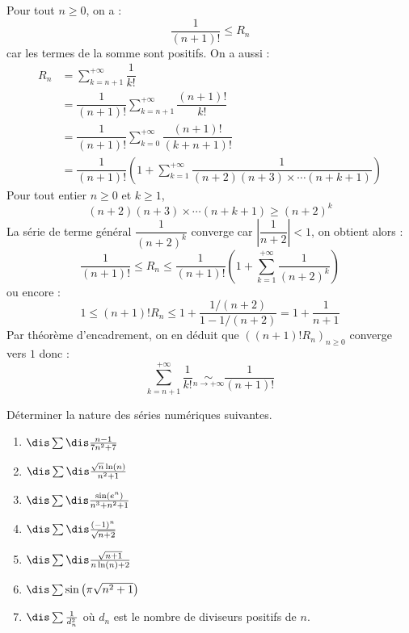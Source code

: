 \documentclass[a4paper,10pt]{report}
\newcommand{\Sum}[2]{\ensuremath{\textstyle{\sum\limits_{#1}^{#2}}}}
\begin{document}
\noindent Pour tout $n \geq 0$, on a :
$$ \dfrac{1}{(n+1)!} \leq R_n$$
car les termes de la somme sont positifs. On a aussi :
\begin{align*}
R_n & = \sum_{k=n+1}^{+ \infty} \dfrac{1}{k!} \\
& = \dfrac{1}{(n+1)!} \sum_{k=n+1}^{+ \infty} \dfrac{(n+1)!}{k!} \\
& = \dfrac{1}{(n+1)!} \sum_{k=0}^{+ \infty} \dfrac{(n+1)!}{(k+n+1)!} \\
& = \dfrac{1}{(n+1)!} \left(1 + \sum_{k=1}^{+ \infty} \dfrac{1}{(n+2)(n+3) \times \cdots (n+k+1)} \right)
\end{align*}
Pour tout entier $n \geq 0$ et $k \geq 1$,
$$ (n+2)(n+3) \times \cdots (n+k+1) \geq (n+2)^k$$
La série de terme général $\dfrac{1}{(n+2)^k}$ converge car $\left\vert \dfrac{1}{n+2} \right\vert<1$, on obtient alors :
$$ \dfrac{1}{(n+1)!} \leq R_n \leq \dfrac{1}{(n+1)!} \left(1+ \sum_{k=1}^{+ \infty} \dfrac{1}{(n+2)^k} \right)$$
ou encore :
$$ 1 \leq (n+1)! R_n \leq 1 + \dfrac{1/(n+2)}{1-1/(n+2)} = 1 + \dfrac{1}{n+1}$$
Par théorème d'encadrement, on en déduit que $((n+1)! R_n)_{n \geq 0}$ converge vers $1$ donc :
$$ \Sum{k=n+1}{+ \infty} \dfrac{1}{k!} \underset{n \rightarrow + \infty}{\sim} \dfrac{1}{(n+1)!}$$


\begin{Exa} Déterminer la nature des séries numériques suivantes.

\begin{multicols}{2}
\begin{enumerate}
\item $\dis\sum \dis\frac{n-1}{7n^2+7}$
\item $\dis\sum\dis\frac{\sqrt{n}\ln(n)}{n^2+1}$
\item $\dis\sum\dis\frac{\sin(e^n)}{n^3+n^2+1}$
\item $\dis\sum \dis\frac{(-1)^n}{\sqrt{n+2}}$
\item $\dis\sum\dis\frac{\sqrt{n+1}}{n\ln(n)+2}$ 
\item $\dis \sum \sin \left({\pi \sqrt {n^2 + 1}} \right)$
\item $\dis \sum \frac{1}{d_n^2}$ où $d_n$ est le nombre de diviseurs positifs de $n$.
\end{enumerate}
\end{multicols}
\end{Exa}
\end{document}
